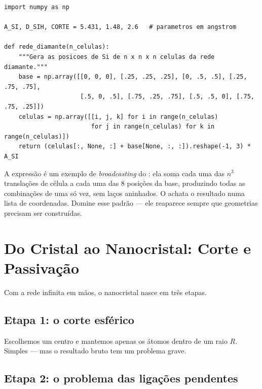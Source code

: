 \begin{lstlisting}[style=python,caption={Gerando a rede diamante do silício.},label={lst:rede}]
import numpy as np

A_SI, D_SIH, CORTE = 5.431, 1.48, 2.6   # parametros em angstrom

def rede_diamante(n_celulas):
    """Gera as posicoes de Si de n x n x n celulas da rede diamante."""
    base = np.array([[0, 0, 0], [.25, .25, .25], [0, .5, .5], [.25, .75, .75],
                     [.5, 0, .5], [.75, .25, .75], [.5, .5, 0], [.75, .75, .25]])
    celulas = np.array([[i, j, k] for i in range(n_celulas)
                        for j in range(n_celulas) for k in range(n_celulas)])
    return (celulas[:, None, :] + base[None, :, :]).reshape(-1, 3) * A_SI
\end{lstlisting}

\begin{caixadica}
A expressão  é um exemplo de
\emph{broadcasting} do \numpy{}: ela soma cada uma das $n^3$ translações de célula
a cada uma das 8 posições da base, produzindo todas as combinações de uma só vez,
sem laços aninhados. O  achata o resultado numa lista de
coordenadas. Domine esse padrão --- ele reaparece sempre que geometrias precisam
ser construídas.
\end{caixadica}

\section{Do Cristal ao Nanocristal: Corte e Passivação}
\label{sec:corte}

Com a rede infinita em mãos, o nanocristal nasce em três etapas.

\subsection{Etapa 1: o corte esférico}

Escolhemos um centro e mantemos apenas os átomos dentro de um raio $R$. Simples ---
mas o resultado bruto tem um problema grave.

\subsection{Etapa 2: o problema das ligações pendentes}

